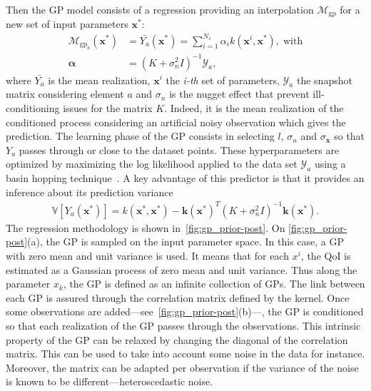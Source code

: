 Then the GP model consists of a regression providing an interpolation $\mathcal{M}_{\text{gp}}$ for a new set of input parameters $\mathbf{x^{*}}$:
\begin{align}
\mathcal{M}_{\text{gp}_{a}}(\mathbf{x}^*)&=\bar{Y_{a}}(\mathbf{x}^*) =  \sum_{i = 1}^{N_s}\alpha_i k (\mathbf{x}^i, \mathbf{x}^*), \;\text{with} \\
\mathbf{\alpha} &= (K + \sigma_n^2 I)^{-1}\mathcal{Y}_a, \nonumber
\end{align}
where $\bar{Y_a}$ is the mean realization, $\mathbf{x}^i$ the \textit{i-th} set of parameters, $\mathcal{Y}_{a}$ the snapshot matrix considering element $a$ and $\sigma_n$ is the nugget effect that prevent ill-conditioning issues for the matrix $K$. Indeed, it is the mean realization of the conditioned process considering an artificial noisy observation which gives the prediction. The learning phase of the GP consists in selecting $l$, $\sigma_n$ and $\sigma_\mathbf{x}$ so that $Y_a$ passes through or close to the dataset points. These hyperparameters are optimized by maximizing the log likelihood applied to the data set $\mathcal{Y}_a$ using a basin hopping technique~\citep{wales1997}. A key advantage of this predictor is that it provides an inference about its prediction variance
\begin{align}
\mathbb{V}[Y_{a}(\mathbf{x}^*)] = k(\mathbf{x}^*, \mathbf{x}^*)-\mathbf{k}(\mathbf{x}^*)^T(K + \sigma_n^2 I)^{-1}\mathbf{k}(\mathbf{x}^*).
\end{align}
The regression methodology is shown in~\cref{fig:gp_prior-post}. On \cref{fig:gp_prior-post}(a), the GP is sampled on the input parameter space. In this case, a GP with zero mean and unit variance is used. It means that for each $x^i$, the QoI is estimated as a Gaussian process of zero mean and unit variance. Thus along the parameter $x_{k}$, the GP is defined as an infinite collection of GPs. The link between each GP is assured through the correlation matrix defined by the kernel. Once some observations are added---see~\cref{fig:gp_prior-post}(b)---, the GP is conditioned so that each realization of the GP passes through the observations. This intrinsic property of the GP can be relaxed by changing the diagonal of the correlation matrix. This can be used to take into account some noise in the data for instance. Moreover, the matrix can be adapted per observation if the variance of the noise is known to be different---heteroscedastic noise.

